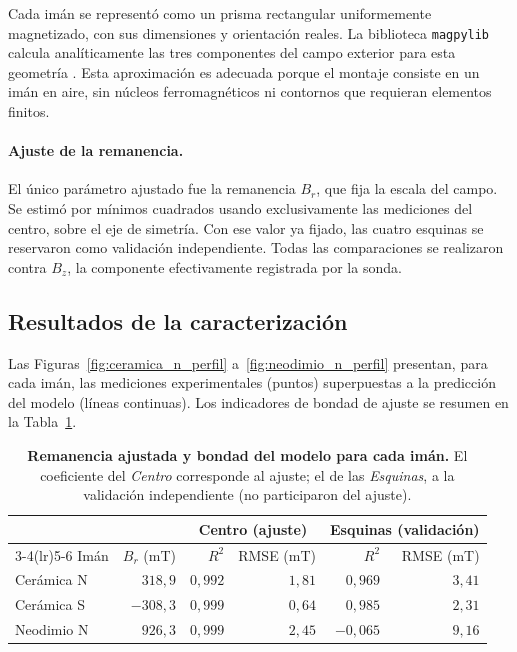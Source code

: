Cada imán se representó como un prisma rectangular uniformemente magnetizado, con sus dimensiones y orientación reales. La biblioteca \texttt{magpylib} calcula analíticamente las tres componentes del campo exterior para esta geometría \cite{magpylib,yang_1990,engel_herbert_2005,camacho_2013}. Esta aproximación es adecuada porque el montaje consiste en un imán en aire, sin núcleos ferromagnéticos ni contornos que requieran elementos finitos.

\paragraph{Ajuste de la remanencia.}
El único parámetro ajustado fue la remanencia \(B_r\), que fija la escala del campo. Se estimó por mínimos cuadrados usando exclusivamente las mediciones del centro, sobre el eje de simetría. Con ese valor ya fijado, las cuatro esquinas se reservaron como validación independiente. Todas las comparaciones se realizaron contra \(B_z\), la componente efectivamente registrada por la sonda.

\subsection{Resultados de la caracterización}

Las Figuras~\ref{fig:ceramica_n_perfil} a~\ref{fig:neodimio_n_perfil} presentan, para cada imán, las mediciones experimentales (puntos) superpuestas a la predicción del modelo (líneas continuas). Los indicadores de bondad de ajuste se resumen en la Tabla~\ref{tab:ajuste_imanes}.

\begin{table}[H]
\small
\setlength{\tabcolsep}{3pt}
    \centering
    \caption[Remanencia ajustada y bondad del modelo para cada imán]{\textbf{Remanencia ajustada y bondad del modelo para cada imán.} El coeficiente del \textit{Centro} corresponde al ajuste; el de las \textit{Esquinas}, a la validación independiente (no participaron del ajuste).}
    \label{tab:ajuste_imanes}
    \begin{tabular}{lrrrrr}
        \toprule
        & & \multicolumn{2}{c}{Centro (ajuste)} & \multicolumn{2}{c}{Esquinas (validación)} \\
        \cmidrule(lr){3-4}\cmidrule(lr){5-6}
        Imán & \(B_r\) (mT) & \(R^2\) & RMSE (mT) & \(R^2\) & RMSE (mT) \\
        \midrule
        Cerámica N & \(318{,}9\)  & \(0{,}992\) & \(1{,}81\) & \(0{,}969\)  & \(3{,}41\) \\
        Cerámica S & \(-308{,}3\) & \(0{,}999\) & \(0{,}64\) & \(0{,}985\)  & \(2{,}31\) \\
        Neodimio N & \(926{,}3\)  & \(0{,}999\) & \(2{,}45\) & \(-0{,}065\) & \(9{,}16\) \\
        \bottomrule
    \end{tabular}
\end{table}


